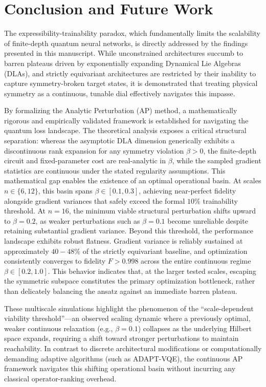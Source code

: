 \documentclass[pdflatex,sn-mathphys-num]{sn-jnl}
\theoremstyle{thmstyleone}
\theoremstyle{thmstyletwo}
\theoremstyle{thmstylethree}
\begin{document}
\section*{Conclusion and Future Work}

The expressibility-trainability paradox, which fundamentally limits the scalability of finite-depth quantum neural networks, is directly addressed by the findings presented in this manuscript. While unconstrained architectures succumb to barren plateaus driven by exponentially expanding Dynamical Lie Algebras (DLAs), and strictly equivariant architectures are restricted by their inability to capture symmetry-broken target states, it is demonstrated that treating physical symmetry as a continuous, tunable dial effectively navigates this impasse.

By formalizing the Analytic Perturbation (AP) method, a mathematically rigorous and empirically validated framework is established for navigating the quantum loss landscape. The theoretical analysis exposes a critical structural separation: whereas the asymptotic DLA dimension generically exhibits a discontinuous rank expansion for any symmetry violation $\beta > 0$, the finite-depth circuit and fixed-parameter cost are real-analytic in $\beta$, while the sampled gradient statistics are continuous under the stated regularity assumptions. This mathematical gap enables the existence of an optimal operational basin. At scales $n \in \{6, 12\}$, this basin spans $\beta \in [0.1, 0.3]$, achieving near-perfect fidelity alongside gradient variances that safely exceed the formal $10\%$ trainability threshold. At $n=16$, the minimum viable structural perturbation shifts upward to $\beta=0.2$, as weaker perturbations such as $\beta=0.1$ become unreliable despite retaining substantial gradient variance. Beyond this threshold, the performance landscape exhibits robust flatness. Gradient variance is reliably sustained at approximately $40{-}48\%$ of the strictly equivariant baseline, and optimization consistently converges to fidelity $F>0.998$ across the entire continuous regime $\beta \in [0.2, 1.0]$. This behavior indicates that, at the larger tested scales, escaping the symmetric subspace constitutes the primary optimization bottleneck, rather than delicately balancing the ansatz against an immediate barren plateau.

These multiscale simulations highlight the phenomenon of the ``scale-dependent viability threshold''---an observed scaling dynamic where a previously optimal, weaker continuous relaxation (e.g., $\beta=0.1$) collapses as the underlying Hilbert space expands, requiring a shift toward stronger perturbations to maintain reachability. In contrast to discrete architectural modifications or computationally demanding adaptive algorithms (such as ADAPT-VQE), the continuous AP framework navigates this shifting operational basin without incurring any classical operator-ranking overhead.
\end{document}
